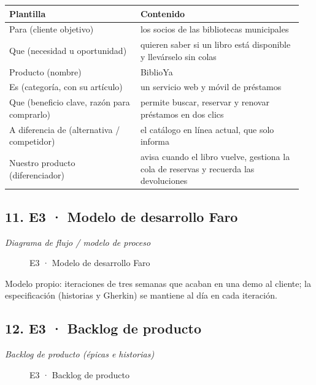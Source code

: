 {\small
\begin{longtable}{@{}>{\raggedright\arraybackslash}p{0.421\linewidth}>{\raggedright\arraybackslash}p{0.528\linewidth}@{}}
\toprule
\textbf{Plantilla} & \textbf{Contenido} \\
\midrule
\endhead
Para (cliente objetivo) & los socios de las bibliotecas municipales \\
Que (necesidad u oportunidad) & quieren saber si un libro está disponible y llevárselo sin colas \\
Producto (nombre) & BiblioYa \\
Es (categoría, con su artículo) & un servicio web y móvil de préstamos \\
Que (beneficio clave, razón para comprarlo) & permite buscar, reservar y renovar préstamos en dos clics \\
A diferencia de (alternativa / competidor) & el catálogo en línea actual, que solo informa \\
Nuestro producto (diferenciador) & avisa cuando el libro vuelve, gestiona la cola de reservas y recuerda las devoluciones \\
\bottomrule
\end{longtable}}

\subsection*{11. E3 · Modelo de desarrollo Faro}

\emph{Diagrama de flujo / modelo de proceso}

\begin{figure}[H]
\centering
{}
\caption{E3 · Modelo de desarrollo Faro}
\end{figure}

Modelo propio: iteraciones de tres semanas que acaban en una demo al cliente; la especificación (historias y Gherkin) se mantiene al día en cada iteración.

\subsection*{12. E3 · Backlog de producto}

\emph{Backlog de producto (épicas e historias)}

\begin{figure}[H]
\centering
{}
\caption{E3 · Backlog de producto}
\end{figure}

